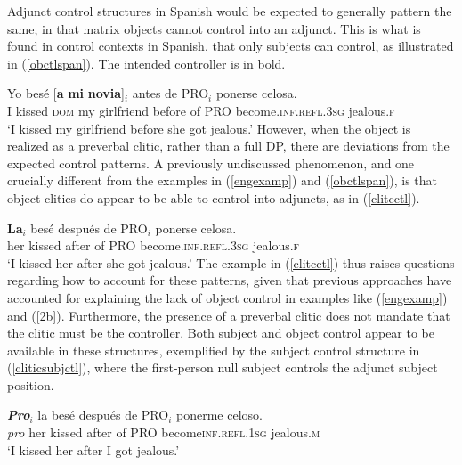 \documentclass[output=paper,colorlinks,citecolor=brown]{langscibook}
\begin{document}
Adjunct control structures in Spanish would be expected to generally pattern the same, in that matrix objects cannot control into an adjunct. This is what is found in control contexts in Spanish, that only subjects can control, as illustrated in (\ref{obctlspan}). The intended controller is in bold.

\ea \label{obctlspan}
\ex \label{2b}
{
\gll *Yo besé [\textbf{a} \textbf{mi} \textbf{novia}]$_{i}$ antes de PRO$_{i}$ ponerse celosa.\\
I kissed \textsc{dom} my girlfriend before of PRO become.\textsc{inf.refl.3sg} jealous.\textsc{f}\\
\glt `I kissed my girlfriend before she got jealous.'
}
\z
\z
However, when the object is realized as a preverbal clitic, rather than a full DP, there are deviations from the expected control patterns. A previously undiscussed phenomenon, and one crucially different from the examples in (\ref{engexamp}) and (\ref{obctlspan}), is that object clitics do appear to be able to control into adjuncts, as in (\ref{clitcctl}).

\ea \label{clitcctl}
{
\gll \textbf{La$_{i}$} besé después de PRO$_{i}$ ponerse celosa.\\
her kissed after of PRO become.\textsc{inf.refl.3sg} jealous.\textsc{f}\\
\glt `I kissed her after she got jealous.'
}
\z
The example in (\ref{clitcctl}) thus raises questions regarding how to account for these patterns, given that previous approaches have accounted for explaining the lack of object control in examples like (\ref{engexamp}) and (\ref{2b}). Furthermore, the presence of a preverbal clitic does not mandate that the clitic must be the controller. Both subject and object control appear to be available in these structures, exemplified by the subject control structure in (\ref{cliticsubjctl}), where the first-person null subject controls the adjunct subject position.

\ea \label{cliticsubjctl}
{
\gll \textit{\textbf{Pro$_{i}$}} la besé después de PRO$_{i}$ ponerme celoso.\\
\textit{pro} her kissed after of PRO become\textsc{inf.refl.1sg} jealous.\textsc{m}\\
\glt `I kissed her after I got jealous.'
}
\z
\end{document}
